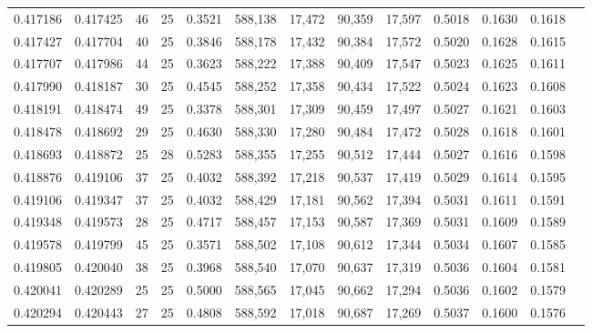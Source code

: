 \begin{tabular}{rrrrrrrrrrrrr}
0.417186 & 0.417425 &    46 &  25 &                                     0.3521 & 588,138 &  17,472 &  90,359 &  17,597 & 0.5018 & 0.1630 & 0.1618 \\
0.417427 & 0.417704 &    40 &  25 &                                     0.3846 & 588,178 &  17,432 &  90,384 &  17,572 & 0.5020 & 0.1628 & 0.1615 \\
0.417707 & 0.417986 &    44 &  25 &                                     0.3623 & 588,222 &  17,388 &  90,409 &  17,547 & 0.5023 & 0.1625 & 0.1611 \\
0.417990 & 0.418187 &    30 &  25 &                                     0.4545 & 588,252 &  17,358 &  90,434 &  17,522 & 0.5024 & 0.1623 & 0.1608 \\
0.418191 & 0.418474 &    49 &  25 &                                     0.3378 & 588,301 &  17,309 &  90,459 &  17,497 & 0.5027 & 0.1621 & 0.1603 \\
0.418478 & 0.418692 &    29 &  25 &                                     0.4630 & 588,330 &  17,280 &  90,484 &  17,472 & 0.5028 & 0.1618 & 0.1601 \\
0.418693 & 0.418872 &    25 &  28 &                                     0.5283 & 588,355 &  17,255 &  90,512 &  17,444 & 0.5027 & 0.1616 & 0.1598 \\
0.418876 & 0.419106 &    37 &  25 &                                     0.4032 & 588,392 &  17,218 &  90,537 &  17,419 & 0.5029 & 0.1614 & 0.1595 \\
0.419106 & 0.419347 &    37 &  25 &                                     0.4032 & 588,429 &  17,181 &  90,562 &  17,394 & 0.5031 & 0.1611 & 0.1591 \\
0.419348 & 0.419573 &    28 &  25 &                                     0.4717 & 588,457 &  17,153 &  90,587 &  17,369 & 0.5031 & 0.1609 & 0.1589 \\
0.419578 & 0.419799 &    45 &  25 &                                     0.3571 & 588,502 &  17,108 &  90,612 &  17,344 & 0.5034 & 0.1607 & 0.1585 \\
0.419805 & 0.420040 &    38 &  25 &                                     0.3968 & 588,540 &  17,070 &  90,637 &  17,319 & 0.5036 & 0.1604 & 0.1581 \\
0.420041 & 0.420289 &    25 &  25 &                                     0.5000 & 588,565 &  17,045 &  90,662 &  17,294 & 0.5036 & 0.1602 & 0.1579 \\
0.420294 & 0.420443 &    27 &  25 &                                     0.4808 & 588,592 &  17,018 &  90,687 &  17,269 & 0.5037 & 0.1600 & 0.1576 \\

\end{tabular}
